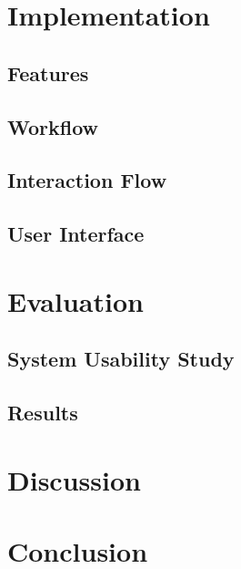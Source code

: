 \documentclass[twoside, parskip]{VRThesis} %
\begin{document}
\chapter{\label{chap::Implementation}Implementation}

\section{\label{sec::Features}Features}

\section{\label{sec::Workflow}Workflow}

\section{\label{sec::InteractionFlow}Interaction Flow}

\section{\label{sec::UserInterface}User Interface}


\chapter{\label{chap::Evaluation}Evaluation}

\section{\label{sec::Methology}System Usability Study}

\section{\label{sec::Results}Results}


\chapter{\label{chap::Discussion}Discussion}


\chapter{\label{chap::Conclusion}Conclusion}



%

\end{document}
